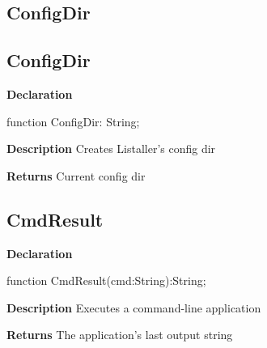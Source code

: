 \documentclass{report}
\newif\ifpdf
\begin{document}
\subsection*{\large{\textbf{ConfigDir}}\normalsize\hspace{1ex}\hrulefill}
\else
\subsection*{ConfigDir}
\fi
\label{utilities-ConfigDir}
\begin{list}{}{
\setlength{\itemindent}{0cm}
\setlength{\listparindent}{0cm}
\setlength{\leftmargin}{\evensidemargin}
\addtolength{\leftmargin}{\tmplength}
\settowidth{\labelsep}{X}
\addtolength{\leftmargin}{\labelsep}
\setlength{\labelwidth}{\tmplength}
}
\item[\textbf{Declaration}\hfill]
\ifpdf
\begin{flushleft}
\fi
\begin{ttfamily}
function ConfigDir: String;\end{ttfamily}

\ifpdf
\end{flushleft}
\fi

\par
\item[\textbf{Description}]
Creates Listaller's config dir \par
\item[\textbf{Returns}]Current config dir


\end{list}
\ifpdf
\subsection*{\large{\textbf{CmdResult}}\normalsize\hspace{1ex}\hrulefill}
\else
\subsection*{CmdResult}
\fi
\label{utilities-CmdResult}
\begin{list}{}{
\setlength{\itemindent}{0cm}
\setlength{\listparindent}{0cm}
\setlength{\leftmargin}{\evensidemargin}
\addtolength{\leftmargin}{\tmplength}
\settowidth{\labelsep}{X}
\addtolength{\leftmargin}{\labelsep}
\setlength{\labelwidth}{\tmplength}
}
\item[\textbf{Declaration}\hfill]
\ifpdf
\begin{flushleft}
\fi
\begin{ttfamily}
function CmdResult(cmd:String):String;\end{ttfamily}

\ifpdf
\end{flushleft}
\fi

\par
\item[\textbf{Description}]
Executes a command{-}line application \par
\item[\textbf{Returns}]The application's last output string


\end{list}
\ifpdf
\end{document}
